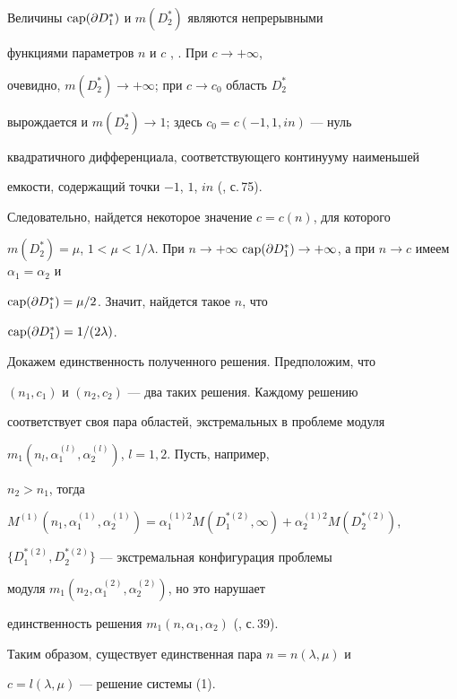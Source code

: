  


\begin{pf} 


Величины $\operatorname{cap}(\partial D^*_1)$ и $m(D^*_2)$ являются непрерывными 


функциями параметров $n$ и $c$ \cite{2}, \cite{3}. При $c\to+\infty$, 


очевидно, $m(D^*_2)\to+\infty$; при $c\to c_0$ область $D^*_2$ 


вырождается и $m(D^*_2)\to1$; здесь $c_0=c(-1,1,in)$ --- нуль 


квадратичного дифференциала, соответствующего континууму наименьшей 


емкости, содержащий точки $-1$, $1$, $in$ (\cite{2}, с.\,75). 


Следовательно, найдется некоторое значение $c=c(n)$, для которого 


$m(D^*_2)=\mu$, $1<\mu<1/\lambda$. При $n\to+\infty$\; $\CAP(\partial 


D^*_1)\to+\infty$, а при $n\to c$ имеем $\alpha_1=\alpha_2$ и 


$\operatorname{cap}(\partial D^*_1)=\mu/2$. Значит, найдется такое $n$, что 


$\operatorname{cap}(\partial D^*_1)=1/(2\lambda)$. 


 


Докажем единственность полученного решения. Предположим, что 


$(n_1,c_1)$ и $(n_2,c_2)$ --- два таких решения. Каждому решению 


соответствует своя пара областей, экстремальных в проблеме модуля 


$m_1(n_l,\alpha^{(l)}_1,\alpha^{(l)}_2)$, $l=1,2$. Пусть, например, 


$n_2>n_1$, тогда 


$M^{(1)}(n_1,\alpha^{(1)}_1,\alpha^{(1)}_2)= 


\alpha^{(1)2}_1M(D^{*(2)}_1,\infty)+\alpha^{(1)2}_2M(D^{*(2)}_2)$, 


$\{D^{*(2)}_1,D^{*(2)}_2\}$ --- экстремальная конфигурация проблемы 


модуля $m_1(n_2,\alpha^{(2)}_1,\alpha^{(2)}_2)$, но это нарушает 


единственность решения $m_1(n,\alpha_1,\alpha_2)$ (\cite{2}, с.\,39). 


Таким образом, существует единственная пара $n=n(\lambda,\mu)$ и 


$c=l(\lambda,\mu)$ --- решение системы (1). 


\end{pf} 


